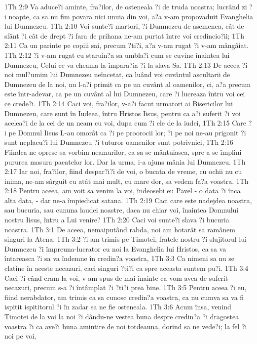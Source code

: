 1Th 2:9  Va aduce?i aminte, fra?ilor, de osteneala ?i de truda noastra; lucrând zi ?i noapte, ca sa nu fim povara nici unuia din voi, a?a v-am propovaduit Evanghelia lui Dumnezeu.
1Th 2:10  Voi sunte?i martori, ?i Dumnezeu de asemenea, cât de sfânt ?i cât de drept ?i fara de prihana ne-am purtat între voi credincio?ii;
1Th 2:11  Ca un parinte pe copiii sai, precum ?ti?i, a?a v-am rugat ?i v-am mângâiat.
1Th 2:12  ?i v-am rugat cu staruin?a sa umbla?i cum se cuvine înaintea lui Dumnezeu, Celui ce va cheama la împara?ia ?i la slava Sa.
1Th 2:13  De aceea ?i noi mul?umim lui Dumnezeu neîncetat, ca luând voi cuvântul ascultarii de Dumnezeu de la noi, nu l-a?i primit ca pe un cuvânt al oamenilor, ci, a?a precum este într-adevar, ca pe un cuvânt al lui Dumnezeu, care ?i lucreaza întru voi cei ce crede?i.
1Th 2:14  Caci voi, fra?ilor, v-a?i facut urmatori ai Bisericilor lui Dumnezeu, care sunt în Iudeea, întru Hristos Iisus, pentru ca a?i suferit ?i voi acelea?i de la cei de un neam cu voi, dupa cum ?i ele de la iudei,
1Th 2:15  Care ?i pe Domnul Iisus L-au omorât ca ?i pe proorocii lor; ?i pe noi ne-au prigonit ?i sunt neplacu?i lui Dumnezeu ?i tuturor oamenilor sunt potrivnici,
1Th 2:16  Fiindca ne opresc sa vorbim neamurilor, ca sa se mântuiasca, spre a se împlini pururea masura pacatelor lor. Dar la urma, i-a ajuns mânia lui Dumnezeu.
1Th 2:17  Iar noi, fra?ilor, fiind despar?i?i de voi, o bucata de vreme, cu ochii nu cu inima, ne-am sârguit cu atât mai mult, cu mare dor, sa vedem fa?a voastra.
1Th 2:18  Pentru aceea, am voit sa venim la voi, îndeosebi eu Pavel - o data ?i înca alta data, - dar ne-a împiedicat satana.
1Th 2:19  Caci care este nadejdea noastra, sau bucuria, sau cununa laudei noastre, daca nu chiar voi, înaintea Domnului nostru Iisus, întru a Lui venire?
1Th 2:20  Caci voi sunte?i slava ?i bucuria noastra.
1Th 3:1  De aceea, nemaiputând rabda, noi am hotarât sa ramânem singuri la Atena.
1Th 3:2  ?i am trimis pe Timotei, fratele nostru ?i slujitorul lui Dumnezeu ?i împreuna-lucrator cu noi la Evanghelia lui Hristos, ca sa va întareasca ?i sa va îndemne în credin?a voastra,
1Th 3:3  Ca nimeni sa nu se clatine în aceste necazuri, caci singuri ?ti?i ca spre aceasta suntem pu?i.
1Th 3:4  Caci ?i când eram la voi, v-am spus de mai înainte ca vom avea de suferit necazuri, precum s-a ?i întâmplat ?i ?ti?i prea bine.
1Th 3:5  Pentru aceea ?i eu, fiind nerabdator, am trimis ca sa cunosc credin?a voastra, ca nu cumva sa va fi ispitit ispititorul ?i în zadar sa ne fie osteneala.
1Th 3:6  Acum însa, venind Timotei de la voi la noi ?i dându-ne vestea buna despre credin?a ?i dragostea voastra ?i ca ave?i buna amintire de noi totdeauna, dorind sa ne vede?i; la fel ?i noi pe voi,
